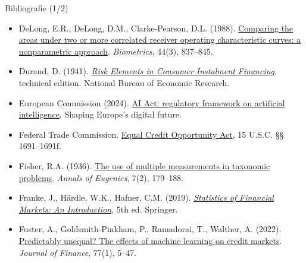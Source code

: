 \begin{frame}{Bibliografie (1/2)}
\begin{itemize}
    \item DeLong, E.R., DeLong, D.M., Clarke-Pearson, D.L. (1988). \href{https://doi.org/10.2307/2531595}{Comparing the areas under two or more correlated receiver operating characteristic curves: a nonparametric approach}. \textit{Biometrics}, 44(3), 837--845.
    \item Durand, D. (1941). \href{https://www.nber.org/books-and-chapters/risk-elements-consumer-instalment-financing-technical-edition}{\textit{Risk Elements in Consumer Instalment Financing}}, technical edition. National Bureau of Economic Research.
    \item European Commission (2024). \href{https://digital-strategy.ec.europa.eu/en/policies/regulatory-framework-ai}{AI Act: regulatory framework on artificial intelligence}. Shaping Europe's digital future.
    \item Federal Trade Commission. \href{https://www.ftc.gov/legal-library/browse/statutes/equal-credit-opportunity-act}{Equal Credit Opportunity Act}, 15 U.S.C. §§ 1691--1691f.
    \item Fisher, R.A. (1936). \href{https://doi.org/10.1111/j.1469-1809.1936.tb02137.x}{The use of multiple measurements in taxonomic problems}. \textit{Annals of Eugenics}, 7(2), 179--188.
    \item Franke, J., Härdle, W.K., Hafner, C.M. (2019). \href{https://doi.org/10.1007/978-3-030-13751-9}{\textit{Statistics of Financial Markets: An Introduction}}, 5th ed. Springer.
    \item Fuster, A., Goldsmith-Pinkham, P., Ramadorai, T., Walther, A. (2022). \href{https://doi.org/10.1111/jofi.13090}{Predictably unequal? The effects of machine learning on credit markets}. \textit{Journal of Finance}, 77(1), 5--47.
\end{itemize}
\end{frame}

